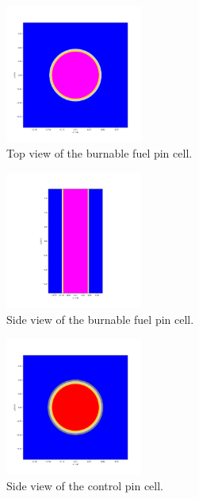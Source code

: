 \documentclass[twocolumn,a4paper,10pt]{article}
\begin{document}
\begin{figure}[ht]
  \centering
  \includegraphics[width=0.4\textwidth]{../Pictures/Burnablefuelrods_plot_xy.png}
  \caption{Top view of the burnable fuel pin cell.}
\end{figure}

\begin{figure}[ht]
  \centering
  \includegraphics[width=0.4\textwidth]{../Pictures/Burnablefuelrods_plot_yz.png}
  \caption{Side view of the burnable fuel pin cell.}
\end{figure}

\begin{figure}[ht]
  \centering
  \includegraphics[width=0.4\textwidth]{../Pictures/Controlrods_plot_xy.png}
  \caption{Side view of the control pin cell.}
\end{figure}
\end{document}
